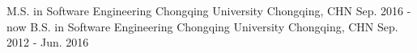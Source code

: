 

\begin{cventries}

  \cventry
    {M.S. in Software Engineering} %
    {Chongqing University} %
    {Chongqing, CHN} %
    {Sep. 2016 - now} %
    {}
  \cventry
	{B.S. in Software Engineering} %
	{Chongqing University} %
	{Chongqing, CHN} %
	{Sep. 2012 - Jun. 2016} %
	{}
\end{cventries}
